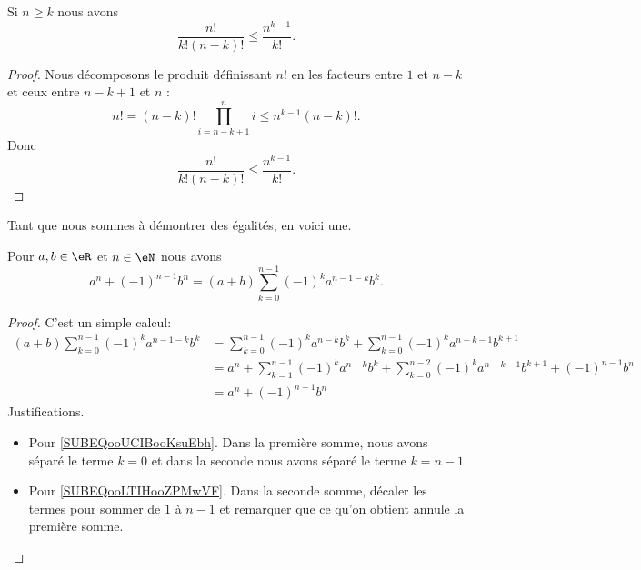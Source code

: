 \begin{lemma}        \label{LEMooLPCXooYIzJsD}
	Si \( n\geq k\) nous avons
	\begin{equation}
		\frac{ n! }{ k!(n-k)! }\leq \frac{ n^{k-1} }{ k! }.
	\end{equation}
\end{lemma}

\begin{proof}
	Nous décomposons le produit définissant \( n!\) en les facteurs entre \( 1\) et \( n-k\) et ceux entre \( n-k+1\) et \( n\) :
	\begin{equation}
		n!=(n-k)!\prod_{i=n-k+1}^ni\leq n^{k-1}(n-k)!.
	\end{equation}
	Donc
	\begin{equation}
		\frac{ n! }{ k!(n-k)! }\leq \frac{ n^{k-1} }{ k! }.
	\end{equation}
\end{proof}

Tant que nous sommes à démontrer des égalités, en voici une.

\begin{lemma}     \label{LEMooLPOQooICJYdV}
	Pour \( a,b\in \eR\) et \( n\in \eN\) nous avons
	\begin{equation}
		a^n+(-1)^{n-1}b^n=(a+b)\sum_{k=0}^{n-1}(-1)^ka^{n-1-k}b^k.
	\end{equation}
\end{lemma}

\begin{proof}
	C'est un simple calcul:
	\begin{subequations}
		\begin{align}
			(a+b)\sum_{k=0}^{n-1}(-1)^ka^{n-1-k}b^k & =  \sum_{k=0}^{n-1}(-1)^ka^{n-k}b^k+\sum_{k=0}^{n-1}(-1)^ka^{n-k-1}b^{k+1}                                                 \\
			                                        & = a^n+\sum_{k=1}^{n-1}(-1)^ka^{n-k}b^k+\sum_{k=0}^{n-2}(-1)^ka^{n-k-1}b^{k+1} +(-1)^{n-1}b^n   \label{SUBEQooUCIBooKsuEbh} \\
			                                        & = a^n+(-1)^{n-1}b^n                                            \label{SUBEQooLTIHooZPMwVF}
		\end{align}
	\end{subequations}
	Justifications.
	\begin{itemize}
		\item Pour \eqref{SUBEQooUCIBooKsuEbh}. Dans la première somme, nous avons séparé le terme \( k=0\) et dans la seconde nous avons séparé le terme \( k=n-1\)
		\item Pour \eqref{SUBEQooLTIHooZPMwVF}. Dans la seconde somme, décaler les termes pour sommer de \( 1\) à \( n-1\) et remarquer que ce qu'on obtient annule la première somme.
	\end{itemize}
\end{proof}



